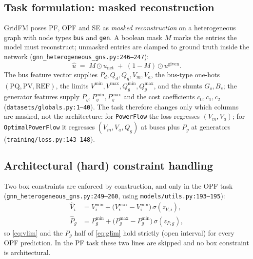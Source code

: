 \documentclass[11pt]{article}
\newcommand{\pred}[1]{\widehat{#1}}
\newcommand{\code}[1]{\texttt{\small #1}}
\newcommand{\sig}{\sigma}
\begin{document}
\subsection{Task formulation: masked reconstruction}

GridFM poses PF, OPF and SE as \emph{masked reconstruction} on a heterogeneous graph with
node types \code{bus} and \code{gen}. A boolean mask $M$ marks the entries the model must
reconstruct; unmasked entries are clamped to ground truth inside the network
(\code{gnn\_heterogeneous\_gns.py:246--247}):
\begin{equation}
\pred{u} \;=\; M\odot u_{\mathrm{net}} \;+\; (1-M)\odot u^{\mathrm{given}} .
\label{eq:gridfm-clamp}
\end{equation}
The bus feature vector supplies $P_d,Q_d,Q_g,V_m,V_a$, the bus-type one-hots
$(\mathrm{PQ},\mathrm{PV},\mathrm{REF})$, the limits $V^{\min},V^{\max},Q_g^{\min},Q_g^{\max}$,
and the shunts $G_s,B_s$; the generator features supply $P_g,P_g^{\min},P_g^{\max}$ and the
cost coefficients $c_0,c_1,c_2$ (\code{datasets/globals.py:1--40}). The task therefore
changes only which columns are masked, not the architecture: for \code{PowerFlow} the loss
regresses $(V_m,V_a)$; for \code{OptimalPowerFlow} it regresses $(V_m,V_a,Q_g)$ at buses
plus $P_g$ at generators (\code{training/loss.py:143--148}).

\subsection{Architectural (hard) constraint handling}

Two box constraints are enforced by construction, and only in the OPF task
(\code{gnn\_heterogeneous\_gns.py:249--260}, using \code{models/utils.py:193--195}):
\begin{align}
\pred{V}_i &= V_i^{\min} + \big(V_i^{\max}-V_i^{\min}\big)\,\sig\!\left(z_{V,i}\right),
\label{eq:gridfm-vbound}\\
\pred{P}_g &= P_g^{\min} + \big(P_g^{\max}-P_g^{\min}\big)\,\sig\!\left(z_{P,g}\right),
\label{eq:gridfm-pbound}
\end{align}
so \eqref{eq:vlim} and the $P_g$ half of \eqref{eq:glim} hold strictly (open interval) for
every OPF prediction. In the PF task these two lines are skipped and no box constraint is
architectural.
\end{document}
